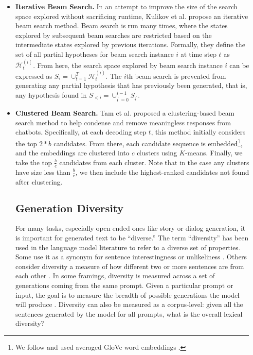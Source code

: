 \begin{itemize}
\item \textbf{Iterative Beam Search.}\quad
In an attempt to improve the size of the search space explored without sacrificing runtime, Kulikov et al. \citep{kulikov2018importance} propose an iterative beam search method.
Beam search is run many times, where the states explored by subsequent beam searches are restricted based on the intermediate states explored by previous iterations.
Formally, they define the set of all partial hypotheses for beam search instance $i$ at time step $t$ as $\mathcal{H}_t^{(i)}$. From here, the search space explored by beam search instance $i$ can be expressed as $S_i = \cup_{t=1}^T \mathcal{H}_t^{(i)}$.
The $i$th beam search is prevented from generating any partial hypothesis that has previously been generated, that is, any hypothesis found in $S_{<i} = \cup_{i^{\prime}=0}^{i-1}S_{i^{\prime}}$.

\item \textbf{Clustered Beam Search.}\quad
Tam et al. \citet{tam2019clustered} proposed a clustering-based beam search method to help condense and remove meaningless responses from chatbots.
Specifically, at each decoding step $t$, this method initially considers the top $2*b$ candidates. From there, each candidate sequence is embedded\footnote{We follow \citet{tam2019clustered} and used averaged GloVe word embeddings \cite{pennington2014glove}.}, and the embeddings are clustered into $c$ clusters using $K$-means. Finally, we take the top $\frac{b}{c}$ candidates from each cluster. Note that in the case any clusters have size less than $\frac{b}{c}$, we then include the highest-ranked candidates not found after clustering.

\subsection{Generation Diversity}
For many tasks, especially open-ended ones like story or dialog generation, it is important for generated text to be ``diverse.''
The term ``diversity'' has been used in the language model literature to refer to a diverse set of properties.
Some use it as a synonym for sentence interestingness or unlikeliness \citep{tatsunori2019unifying}.
Others consider diversity a measure of how different two or more sentences are from each other \citep{vijayakumar2016diverse,gimpel2013systematic}.
In some framings, diversity is measured across a set of generations coming from the same prompt.
Given a particular prompt or input, the goal is to measure the breadth of possible generations the model will produce \citep{mayhew2020simultaneous}.
Diversity can also be measured as a corpus-level: given all the sentences generated by the model for all prompts, what is the overall lexical diversity?


\end{itemize}

